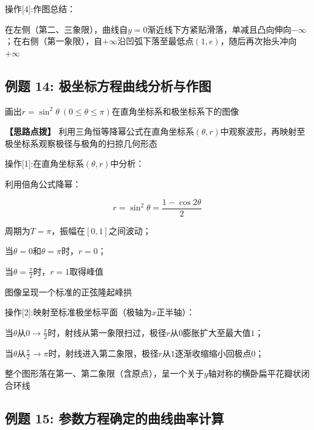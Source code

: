\documentclass[11pt,a4paper,UTF8]{ctexart}
\begin{document}
操作[4]:作图总结：

\begin{solbox}[分步推导与答题规范]
在左侧（第二、三象限），曲线自$y = 0$渐近线下方紧贴滑落，单减且凸向伸向$-\infty$；在右侧（第一象限），自$+\infty$沿凹弧下落至最低点$(1, e)$，随后再次抬头冲向$+\infty$
\end{solbox}


\subsection{例题 14: 极坐标方程曲线分析与作图}

画出$r = \sin^2\theta\ (0 \le \theta \le \pi)$在直角坐标系和极坐标系下的图像

\textbf{\color{DeepPurple}【思路点拨】} 利用三角恒等降幂公式在直角坐标系$(\theta, r)$中观察波形，再映射至极坐标系观察极径与极角的扫掠几何形态


操作[1]:在直角坐标系$(\theta, r)$中分析：

\begin{solbox}[分步推导与答题规范]
利用倍角公式降幂：


\begin{equation*}
r = \sin^2\theta = \frac{1 - \cos 2\theta}{2}
\end{equation*}


周期为$T = \pi$，振幅在$[0, 1]$之间波动；

当$\theta = 0$和$\theta = \pi$时，$r = 0$；

当$\theta = \frac{\pi}{2}$时，$r = 1$取得峰值

图像呈现一个标准的正弦隆起峰拱
\end{solbox}

操作[2]:映射至标准极坐标平面（极轴为$x$正半轴）：

\begin{solbox}[分步推导与答题规范]
当$\theta$从$0 \to \frac{\pi}{2}$时，射线从第一象限扫过，极径$r$从$0$膨胀扩大至最大值$1$；

当$\theta$从$\frac{\pi}{2} \to \pi$时，射线进入第二象限，极径$r$从$1$逐渐收缩缩小回极点$0$；

整个图形落在第一、第二象限（含原点），呈一个关于$y$轴对称的横卧扁平花瓣状闭合环线
\end{solbox}


\subsection{例题 15: 参数方程确定的曲线曲率计算}
\end{document}
